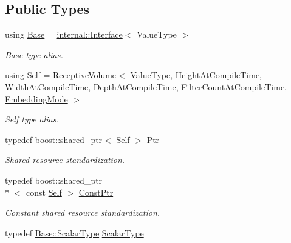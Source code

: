 \subsection*{Public Types}
\begin{DoxyCompactItemize}
\item 
using \hyperlink{classffnn_1_1layer_1_1_receptive_volume_a99a6c14984f9d1cc731f1b1b6e00fb2c}{Base} = \hyperlink{classffnn_1_1layer_1_1internal_1_1_interface}{internal\-::\-Interface}$<$ Value\-Type $>$
\begin{DoxyCompactList}\small\item\em Base type alias. \end{DoxyCompactList}\item 
using \hyperlink{classffnn_1_1layer_1_1_receptive_volume_a109443dccd1eddb55aec1b2810030606}{Self} = \hyperlink{classffnn_1_1layer_1_1_receptive_volume}{Receptive\-Volume}$<$ Value\-Type, Height\-At\-Compile\-Time, Width\-At\-Compile\-Time, Depth\-At\-Compile\-Time, Filter\-Count\-At\-Compile\-Time, \hyperlink{namespaceffnn_1_1layer_a254f16beba4fb335d935e9b43bb9e69a}{Embedding\-Mode} $>$
\begin{DoxyCompactList}\small\item\em Self type alias. \end{DoxyCompactList}\item 
typedef boost\-::shared\-\_\-ptr$<$ \hyperlink{classffnn_1_1layer_1_1_receptive_volume_a109443dccd1eddb55aec1b2810030606}{Self} $>$ \hyperlink{classffnn_1_1layer_1_1_receptive_volume_a1c32fe58cfaa6873d328d36eada78a7f}{Ptr}
\begin{DoxyCompactList}\small\item\em Shared resource standardization. \end{DoxyCompactList}\item 
typedef boost\-::shared\-\_\-ptr\\*
$<$ const \hyperlink{classffnn_1_1layer_1_1_receptive_volume_a109443dccd1eddb55aec1b2810030606}{Self} $>$ \hyperlink{classffnn_1_1layer_1_1_receptive_volume_ad3e48c66c8bc1b5f3bc20dc8c75f2c64}{Const\-Ptr}
\begin{DoxyCompactList}\small\item\em Constant shared resource standardization. \end{DoxyCompactList}\item 
typedef \hyperlink{classffnn_1_1layer_1_1internal_1_1_interface_a7f834e3365e5199bcbcd16d9abd63941}{Base\-::\-Scalar\-Type} \hyperlink{classffnn_1_1layer_1_1_receptive_volume_a4b3e846caf0136f173b3e0ceff912eac}{Scalar\-Type}

\end{DoxyCompactItemize}
